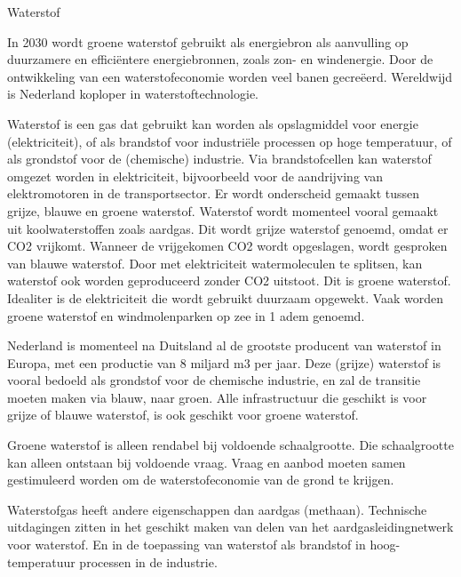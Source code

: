 \begin{voorstel}{Waterstof}


\begin{samenvatting}
In 2030 wordt groene waterstof gebruikt als energiebron als aanvulling op duurzamere en efficiëntere energiebronnen, zoals zon- en windenergie. Door de ontwikkeling van een waterstofeconomie worden veel banen gecreëerd. Wereldwijd is Nederland koploper in waterstoftechnologie.
\end{samenvatting}

\begin{multicols*}{2}

\begin{uitdaging}
Waterstof is een gas dat gebruikt kan worden als opslagmiddel voor energie (elektriciteit), of als brandstof voor industriële processen op hoge temperatuur, of als grondstof voor de (chemische) industrie. Via brandstofcellen kan waterstof omgezet worden in elektriciteit, bijvoorbeeld voor de aandrijving van elektromotoren in de transportsector. 
Er wordt onderscheid gemaakt tussen grijze, blauwe en groene waterstof. Waterstof wordt momenteel vooral gemaakt uit koolwaterstoffen zoals aardgas. Dit wordt grijze waterstof genoemd, omdat er  CO2 vrijkomt. Wanneer de vrijgekomen CO2 wordt opgeslagen, wordt gesproken van blauwe waterstof. Door met elektriciteit watermoleculen te splitsen, kan waterstof ook worden geproduceerd zonder CO2 uitstoot. Dit is groene waterstof. Idealiter is de elektriciteit die wordt gebruikt duurzaam opgewekt. Vaak worden groene waterstof en windmolenparken op zee in 1 adem genoemd.

Nederland is momenteel na Duitsland al de grootste producent van waterstof in Europa, met een productie van 8 miljard m3 per jaar. Deze (grijze) waterstof is vooral bedoeld als grondstof voor de chemische industrie, en zal de transitie moeten maken via blauw, naar groen. Alle infrastructuur die geschikt is voor grijze of blauwe waterstof, is ook geschikt voor groene waterstof.

Groene waterstof is alleen rendabel bij voldoende schaalgrootte. Die schaalgrootte kan alleen ontstaan bij voldoende vraag. Vraag en aanbod moeten samen gestimuleerd worden om de waterstofeconomie van de grond te krijgen.

Waterstofgas heeft andere eigenschappen dan aardgas (methaan). Technische uitdagingen zitten in het geschikt maken van delen van het aardgasleidingnetwerk voor waterstof. En in de toepassing van waterstof als brandstof in hoog-temperatuur processen in de industrie.
\end{uitdaging}


\end{multicols*}
\end{voorstel}
